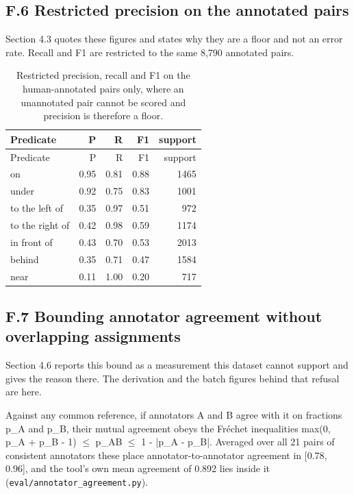 \subsection{F.6 Restricted precision on the annotated pairs}

Section 4.3 quotes these figures and states why they are a floor and not an error rate. Recall and F1 are restricted to the same 8,790 annotated pairs.

\begin{center}
\setlength{\tabcolsep}{6pt}
\small
\begin{longtable}{lrrrr}
\caption[Restricted precision, recall and F1 on the human-annotated]{Restricted precision, recall and F1 on the human-annotated pairs only, where an unannotated pair cannot be scored and precision is therefore a floor.}\\
\hline
Predicate & P & R & F1 & support \\
\hline
\endfirsthead
\hline
Predicate & P & R & F1 & support \\
\hline
\endhead
on & 0.95 & 0.81 & 0.88 & 1465 \\
under & 0.92 & 0.75 & 0.83 & 1001 \\
to the left of & 0.35 & 0.97 & 0.51 & 972 \\
to the right of & 0.42 & 0.98 & 0.59 & 1174 \\
in front of & 0.43 & 0.70 & 0.53 & 2013 \\
behind & 0.35 & 0.71 & 0.47 & 1584 \\
near & 0.11 & 1.00 & 0.20 & 717 \\
\hline
\end{longtable}
\end{center}

\subsection{F.7 Bounding annotator agreement without overlapping assignments}

Section 4.6 reports this bound as a measurement this dataset cannot support and gives the reason there. The derivation and the batch figures behind that refusal are here.

Against any common reference, if annotators A and B agree with it on fractions p\_\allowbreak{}A and p\_\allowbreak{}B, their mutual agreement obeys the Fréchet inequalities max(0, p\_\allowbreak{}A + p\_\allowbreak{}B - 1) $\leq$ p\_\allowbreak{}AB $\leq$ 1 - |p\_\allowbreak{}A - p\_\allowbreak{}B|. Averaged over all 21 pairs of consistent annotators these place annotator-to-annotator agreement in [0.78, 0.96], and the tool's own mean agreement of 0.892 lies inside it (\texttt{eval/annotator\_\allowbreak{}agreement.py}).

